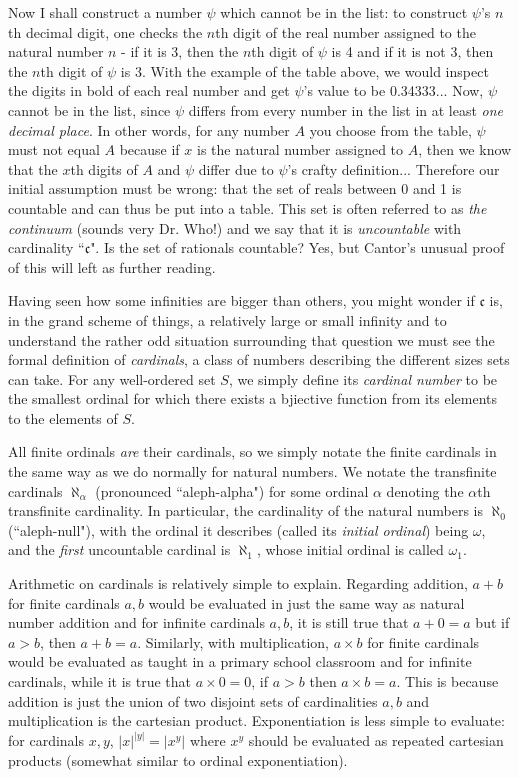 Now I shall construct a number \(\psi\) which cannot be in the list: to construct \(\psi\)'s \(n\)th decimal digit, one checks the \(n\)th digit of the real number assigned to the natural number \(n\) - if it is 3, then the \(n\)th digit of \(\psi\) is 4 and if it is not 3, then the \(n\)th digit of \(\psi\) is 3. With the example of the table above, we would inspect the digits in bold of each real number and get \(\psi\)'s value to be 0.34333... Now, \(\psi\) cannot be in the list, since \(\psi\) differs from every number in the list in at least \textit{one decimal place}. In other words, for any number \(A\) you choose from the table, \(\psi\) must not equal \(A\) because if \(x\) is the natural number assigned to \(A\), then we know that the \(x\)th digits of \(A\) and \(\psi\) differ due to \(\psi\)'s crafty definition... Therefore our initial assumption must be wrong: that the set of reals between 0 and 1 is countable and can thus be put into a table. This set is often referred to as \textit{the continuum} (sounds very Dr. Who!) and we say that it is \textit{uncountable} with cardinality ``\(\mathfrak{c}\)". Is the set of rationals countable? Yes, but Cantor's unusual proof of this will left as further reading.

Having seen how some infinities are bigger than others, you might wonder if \(\mathfrak{c}\) is, in the grand scheme of things, a relatively large or small infinity and to understand the rather odd situation surrounding that question we must see the formal definition of \textit{cardinals}, a class of numbers describing the different sizes sets can take. For any well-ordered set \(S\), we simply define its \textit{cardinal number} to be the smallest ordinal for which there exists a bjiective function from its elements to the elements of \(S\).

All finite ordinals \textit{are} their cardinals, so we simply notate the finite cardinals in the same way as we do normally for natural numbers. We notate the transfinite cardinals \(\aleph_\alpha\) (pronounced ``aleph-alpha") for some ordinal \(\alpha\) denoting the \(\alpha\)th transfinite cardinality. In particular, the cardinality of the natural numbers is \(\aleph_0\) (``aleph-null"), with the ordinal it describes (called its \textit{initial ordinal}) being \(\omega\), and the \textit{first} uncountable cardinal is \(\aleph_1\), whose initial ordinal is called \(\omega_1\).

Arithmetic on cardinals is relatively simple to explain. Regarding addition, \(a+b\) for finite cardinals \(a, b\) would be evaluated in just the same way as natural number addition and for infinite cardinals \(a, b\), it is still true that \(a+0=a\) but if \(a>b\), then \(a+b=a\). Similarly, with multiplication, \(a\times{}b\) for finite cardinals would be evaluated as taught in a primary school classroom and for infinite cardinals, while it is true that \(a\times{}0=0\), if \(a>b\) then \(a\times{}b = a\). This is because addition is just the union of two disjoint sets of cardinalities \(a, b\) and multiplication is the cartesian product. Exponentiation is less simple to evaluate: for cardinals \(x, y\), \(|x|^{|y|} = |x^y|\) where \(x^y\) should be evaluated as repeated cartesian products (somewhat similar to ordinal exponentiation).

